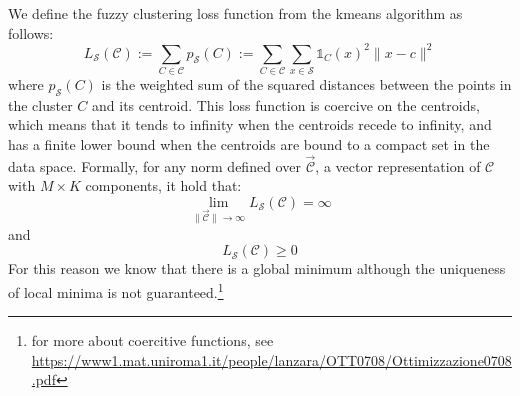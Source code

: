 \begin{definition}\label{def:fuzzyloss}
	We define the fuzzy clustering loss function from the \gls{kmeans} algorithm as follows:
	\begin{equation}
		L_\mathcal{S}(\mathcal{C}) := \sum_{C\in\mathcal{C}}p_\mathcal{S}(C) := \sum_{C\in\mathcal{C}}\sum_{x \in \mathcal{S}}\mathds{1}_C(x)^2\|x-c\|^2
		\label{eq:loss}
	\end{equation}
	\noindent where $p_\mathcal{S}(C)$ is the weighted sum of the squared distances between the points in the cluster $C$ and its centroid. This loss function is coercive on the centroids, which means that it tends to infinity when the centroids recede to infinity, and has a finite lower bound when the centroids are bound to a compact set in the data space. Formally, for any norm defined over $\vec{\mathcal{C}}$, a vector representation of $\mathcal{C}$ with $M\times K$ components, it hold that:
	\begin{equation*}
		\lim_{\|\vec{\mathcal{C}}\|\to\infty} L_\mathcal{S}(\mathcal{C}) = \infty
	\end{equation*}
	and
	\begin{equation*}
		L_\mathcal{S}(\mathcal{C}) \geq 0
	\end{equation*}
	For this reason we know that there is a global minimum although the uniqueness of local minima is not guaranteed.\footnote{for more about coercitive functions, see \\ \url{https://www1.mat.uniroma1.it/people/lanzara/OTT0708/Ottimizzazione0708.pdf}}
\end{definition}

